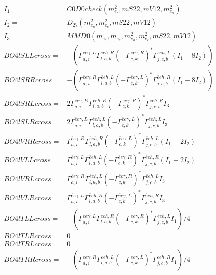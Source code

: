 \documentclass[A4,landscape]{article}
\begin{document}
\begin{align} 
I_1 = & C0D0check(m^2_{e_{{c}}}, mS22, mV12, m^2_{e_{{a}}}) \\ 
I_2 = & D_{27}(m^2_{e_{{a}}}, m^2_{e_{{c}}}, mS22, mV12) \\ 
I_3 = & MMD0(m_{e_{{a}}}, m_{e_{{c}}}, m^2_{e_{{a}}}, m^2_{e_{{c}}}, mS22, mV12) \\ 
  BO4lSLLcross= & -( \Gamma^{\bar{e}e \gamma ,L}_{a, i} \Gamma^{\bar{e}e h ,R}_{l, a, b} (- \Gamma^{\bar{e}e \gamma ,R} _{c, k})^* \Gamma^{\bar{e}e h ,L}_{j, c, b} (I_1 - 8 I_2)) \\ 
  BO4lSRRcross= & -( \Gamma^{\bar{e}e \gamma ,R}_{a, i} \Gamma^{\bar{e}e h ,L}_{l, a, b} (- \Gamma^{\bar{e}e \gamma ,L} _{c, k})^* \Gamma^{\bar{e}e h ,R}_{j, c, b} (I_1 - 8 I_2)) \\ 
  BO4lSRLcross= & 2  \Gamma^{\bar{e}e \gamma ,R}_{a, i} \Gamma^{\bar{e}e h ,R}_{l, a, b} (- \Gamma^{\bar{e}e \gamma ,R} _{c, k})^* \Gamma^{\bar{e}e h ,R}_{j, c, b} I_3 \\ 
  BO4lSLRcross= & 2  \Gamma^{\bar{e}e \gamma ,L}_{a, i} \Gamma^{\bar{e}e h ,L}_{l, a, b} (- \Gamma^{\bar{e}e \gamma ,L} _{c, k})^* \Gamma^{\bar{e}e h ,L}_{j, c, b} I_3 \\ 
  BO4lVRRcross= &  \Gamma^{\bar{e}e \gamma ,R}_{a, i} \Gamma^{\bar{e}e h ,R}_{l, a, b} (- \Gamma^{\bar{e}e \gamma ,L} _{c, k})^* \Gamma^{\bar{e}e h ,L}_{j, c, b} (I_1 - 2 I_2) \\ 
  BO4lVLLcross= &  \Gamma^{\bar{e}e \gamma ,L}_{a, i} \Gamma^{\bar{e}e h ,L}_{l, a, b} (- \Gamma^{\bar{e}e \gamma ,R} _{c, k})^* \Gamma^{\bar{e}e h ,R}_{j, c, b} (I_1 - 2 I_2) \\ 
  BO4lVRLcross= &  \Gamma^{\bar{e}e \gamma ,R}_{a, i} \Gamma^{\bar{e}e h ,L}_{l, a, b} (- \Gamma^{\bar{e}e \gamma ,R} _{c, k})^* \Gamma^{\bar{e}e h ,L}_{j, c, b} I_3 \\ 
  BO4lVLRcross= &  \Gamma^{\bar{e}e \gamma ,L}_{a, i} \Gamma^{\bar{e}e h ,R}_{l, a, b} (- \Gamma^{\bar{e}e \gamma ,L} _{c, k})^* \Gamma^{\bar{e}e h ,R}_{j, c, b} I_3 \\ 
  BO4lTLLcross= & -( \Gamma^{\bar{e}e \gamma ,L}_{a, i} \Gamma^{\bar{e}e h ,R}_{l, a, b} (- \Gamma^{\bar{e}e \gamma ,R} _{c, k})^* \Gamma^{\bar{e}e h ,L}_{j, c, b} I_1)/4 \\ 
  BO4lTLRcross= & 0 \\ 
  BO4lTRLcross= & 0 \\ 
  BO4lTRRcross= & -( \Gamma^{\bar{e}e \gamma ,R}_{a, i} \Gamma^{\bar{e}e h ,L}_{l, a, b} (- \Gamma^{\bar{e}e \gamma ,L} _{c, k})^* \Gamma^{\bar{e}e h ,R}_{j, c, b} I_1)/4 \\ 
\end{align} 
\end{document}
